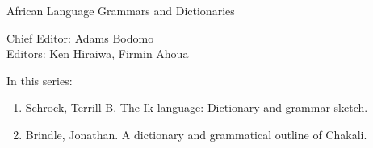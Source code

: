 {\large African Language Grammars and Dictionaries}

\bigskip

Chief Editor:    Adams Bodomo \\
Editors:    Ken Hiraiwa,    Firmin Ahoua 

\bigskip

In this series:

\begin{enumerate}
\item Schrock, Terrill B. The Ik language: Dictionary and grammar sketch.
\item Brindle, Jonathan. A dictionary and grammatical outline of Chakali.
\end{enumerate}


\vfill

